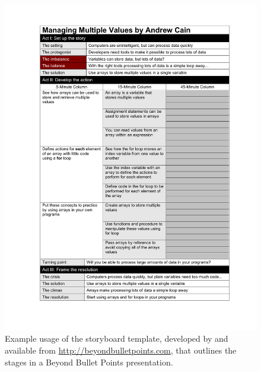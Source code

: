 \begin{figure}[htbp]
	\centering
	\includegraphics[width=\textwidth]{bbp}
	\caption{Example usage of the storyboard template, developed by \citet{Atkinson:2007} and available from \url{http://beyondbulletpoints.com}, that outlines the stages in a Beyond Bullet Points presentation.}
	\label{fig:bbp}
\end{figure}

